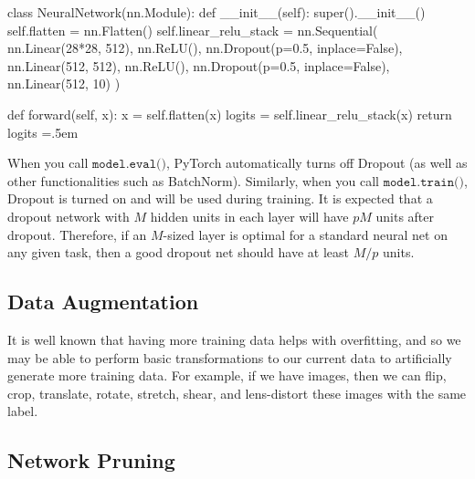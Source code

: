 \documentclass{article}
\newenvironment{cverbatim}
    {\SaveVerbatim{cverb}}
    {\endSaveVerbatim
      \flushleft\fboxrule=0pt\fboxsep=.5em
      \colorbox{cverbbg}{%
        \makebox[\dimexpr\linewidth-2\fboxsep][l]{\BUseVerbatim{cverb}}%
      }
      \endflushleft
  }
\theoremstyle{definition}
\theoremstyle{remark}
\theoremstyle{definition}
\begin{document}
    \begin{cverbatim}
    class NeuralNetwork(nn.Module):
        def __init__(self):
            super().__init__()
            self.flatten = nn.Flatten()
            self.linear_relu_stack = nn.Sequential(
                nn.Linear(28*28, 512),
                nn.ReLU(),
                nn.Dropout(p=0.5, inplace=False), 
                nn.Linear(512, 512),
                nn.ReLU(),
                nn.Dropout(p=0.5, inplace=False), 
                nn.Linear(512, 10)
            )

        def forward(self, x):
            x = self.flatten(x)
            logits = self.linear_relu_stack(x)
            return logits
    \end{cverbatim}

    When you call $\texttt{model.eval()}$, PyTorch automatically turns off Dropout (as well as other functionalities such as BatchNorm). Similarly, when you call $\texttt{model.train()}$, Dropout is turned on and will be used during training. It is expected that a dropout network with $M$ hidden units in each layer will have $pM$ units after dropout. Therefore, if an $M$-sized layer is optimal for a standard neural net on any given task, then a good dropout net should have at least $M/p$ units. 

  \subsection{Data Augmentation}

    It is well known that having more training data helps with overfitting, and so we may be able to perform basic transformations to our current data to artificially generate more training data. For example, if we have images, then we can flip, crop, translate, rotate, stretch, shear, and lens-distort these images with the same label. 

  \subsection{Network Pruning}
\end{document}
